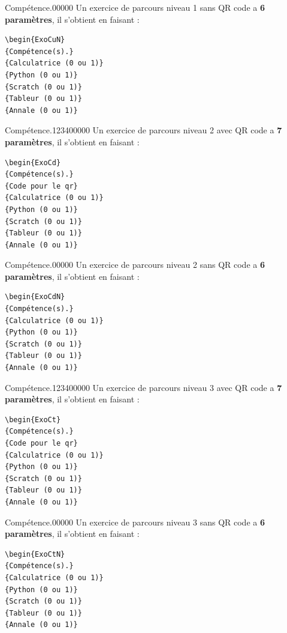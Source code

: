 \begin{pageAD}
\begin{ExoCuN}{Compétence.}{0}{0}{0}{0}{0}
Un exercice de parcours niveau 1 sans QR code a \textbf{6 paramètres}, il s'obtient en faisant : 
\begin{verbatim}
\begin{ExoCuN}
{Compétence(s).}
{Calculatrice (0 ou 1)}
{Python (0 ou 1)}
{Scratch (0 ou 1)}
{Tableur (0 ou 1)}
{Annale (0 ou 1)}
\end{verbatim}
\end{ExoCuN}

\begin{ExoCd}{Compétence.}{1234}{0}{0}{0}{0}{0}
Un exercice de parcours niveau 2 avec QR code a \textbf{7 paramètres}, il s'obtient en faisant : 
\begin{verbatim}
\begin{ExoCd}
{Compétence(s).}
{Code pour le qr}
{Calculatrice (0 ou 1)}
{Python (0 ou 1)}
{Scratch (0 ou 1)}
{Tableur (0 ou 1)}
{Annale (0 ou 1)}
\end{verbatim}
\end{ExoCd}

\begin{ExoCdN}{Compétence.}{0}{0}{0}{0}{0}
Un exercice de parcours niveau 2 sans QR code a \textbf{6 paramètres}, il s'obtient en faisant : 
\begin{verbatim}
\begin{ExoCdN}
{Compétence(s).}
{Calculatrice (0 ou 1)}
{Python (0 ou 1)}
{Scratch (0 ou 1)}
{Tableur (0 ou 1)}
{Annale (0 ou 1)}
\end{verbatim}
\end{ExoCdN}

\begin{ExoCt}{Compétence.}{1234}{0}{0}{0}{0}{0}
Un exercice de parcours niveau 3 avec QR code a \textbf{7 paramètres}, il s'obtient en faisant : 
\begin{verbatim}
\begin{ExoCt}
{Compétence(s).}
{Code pour le qr}
{Calculatrice (0 ou 1)}
{Python (0 ou 1)}
{Scratch (0 ou 1)}
{Tableur (0 ou 1)}
{Annale (0 ou 1)}
\end{verbatim}
\end{ExoCt}

\begin{ExoCtN}{Compétence.}{0}{0}{0}{0}{0}
Un exercice de parcours niveau 3 sans QR code a \textbf{6 paramètres}, il s'obtient en faisant : 
\begin{verbatim}
\begin{ExoCtN}
{Compétence(s).}
{Calculatrice (0 ou 1)}
{Python (0 ou 1)}
{Scratch (0 ou 1)}
{Tableur (0 ou 1)}
{Annale (0 ou 1)}
\end{verbatim}
\end{ExoCtN}


\end{pageAD}

